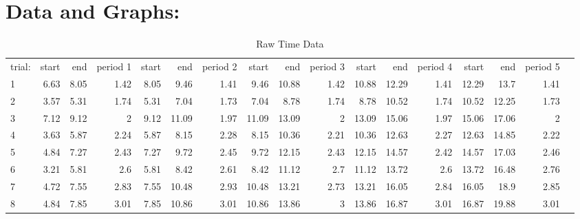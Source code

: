 \documentclass[12pt]{extarticle}
\begin{document}
\section{Data and Graphs:}
\begin{table}[!htp]\centering
    \caption{Raw Time Data}\label{tab: }
    \scriptsize
    \begin{tabular}{lrrrrrrrrrrrrrrrr}\toprule
        trial: & start & end  & period 1 & start & end   & period 2 & start & end   & period 3 & start & end   & period 4 & start & end   & period 5 \\\cmidrule{1-16}
        1      & 6.63  & 8.05 & 1.42     & 8.05  & 9.46  & 1.41     & 9.46  & 10.88 & 1.42     & 10.88 & 12.29 & 1.41     & 12.29 & 13.7  & 1.41     \\\cmidrule{1-16}
        2      & 3.57  & 5.31 & 1.74     & 5.31  & 7.04  & 1.73     & 7.04  & 8.78  & 1.74     & 8.78  & 10.52 & 1.74     & 10.52 & 12.25 & 1.73     \\\cmidrule{1-16}
        3      & 7.12  & 9.12 & 2        & 9.12  & 11.09 & 1.97     & 11.09 & 13.09 & 2        & 13.09 & 15.06 & 1.97     & 15.06 & 17.06 & 2        \\\cmidrule{1-16}
        4      & 3.63  & 5.87 & 2.24     & 5.87  & 8.15  & 2.28     & 8.15  & 10.36 & 2.21     & 10.36 & 12.63 & 2.27     & 12.63 & 14.85 & 2.22     \\\cmidrule{1-16}
        5      & 4.84  & 7.27 & 2.43     & 7.27  & 9.72  & 2.45     & 9.72  & 12.15 & 2.43     & 12.15 & 14.57 & 2.42     & 14.57 & 17.03 & 2.46     \\\cmidrule{1-16}
        6      & 3.21  & 5.81 & 2.6      & 5.81  & 8.42  & 2.61     & 8.42  & 11.12 & 2.7      & 11.12 & 13.72 & 2.6      & 13.72 & 16.48 & 2.76     \\\cmidrule{1-16}
        7      & 4.72  & 7.55 & 2.83     & 7.55  & 10.48 & 2.93     & 10.48 & 13.21 & 2.73     & 13.21 & 16.05 & 2.84     & 16.05 & 18.9  & 2.85     \\\cmidrule{1-16}
        8      & 4.84  & 7.85 & 3.01     & 7.85  & 10.86 & 3.01     & 10.86 & 13.86 & 3        & 13.86 & 16.87 & 3.01     & 16.87 & 19.88 & 3.01     \\\midrule
        \bottomrule
    \end{tabular}
\end{table}
\end{document}
